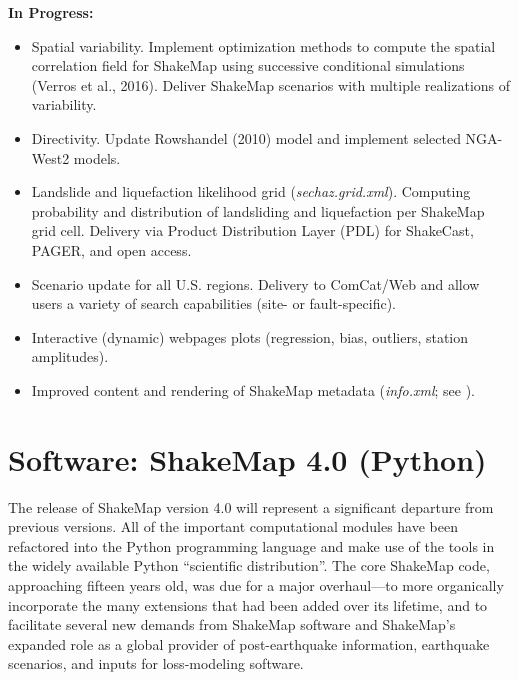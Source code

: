 \documentclass[letterpaper,10pt,english]{sphinxmanual}
\begin{document}
\textbf{In Progress:}
\begin{itemize}
\item {} 
Spatial variability. Implement optimization methods to compute the spatial correlation field for ShakeMap
using successive conditional simulations (Verros et al., 2016).
Deliver ShakeMap scenarios with multiple realizations of variability.

\item {} 
Directivity. Update Rowshandel (2010) model and implement selected NGA-West2 models.

\item {} 
Landslide and liquefaction likelihood grid (\emph{sechaz.grid.xml}). Computing probability and distribution of landsliding and liquefaction per
ShakeMap grid cell. Delivery via Product Distribution Layer (PDL) for ShakeCast, PAGER, and open access.

\item {} 
Scenario update for all U.S. regions. Delivery to ComCat/Web and allow users a variety of search capabilities (site- or fault-specific).

\item {} 
Interactive (dynamic) webpages plots (regression, bias, outliers, station amplitudes).

\item {} 
Improved content and rendering of ShakeMap metadata (\emph{info.xml}; see {\hyperref[references:thompson2016]{}}).

\end{itemize}


\section{Software: ShakeMap 4.0 (Python)}
\label{future_directions:software-shakemap-4-0-python}
The release of ShakeMap version 4.0 will represent a significant departure from
previous versions. All of the important computational modules have been
refactored into the Python programming language and make use of the tools in
the widely available Python “scientific distribution”. The core ShakeMap code,
approaching fifteen years old, was due for a major overhaul---to more
organically incorporate the many extensions that had been added over its
lifetime, and to facilitate several new demands from ShakeMap software and
ShakeMap’s expanded role as a global provider of post-earthquake information,
earthquake scenarios, and inputs for loss-modeling software.
\end{document}
